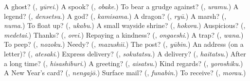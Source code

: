 \begin{tcolorbox}[breakable,colback=teal!4,colframe=teal!35!black,title={Before you move on}]
A ghost? (\textbf{}, \emph{yūrei}.) A spook? (\textbf{}, \emph{obake}.) To bear a grudge against? (\textbf{}, \emph{uramu}.) A legend? (\textbf{}, \emph{densetsu}.) A god? (\textbf{}, \emph{kamisama}.) A dragon? (\textbf{}, \emph{ryū}.) A marsh? (\textbf{}, \emph{numa}.) To float up? (\textbf{}, \emph{ukabu}.) A small wayside shrine? (\textbf{}, \emph{hokora}.) Auspicious? (\textbf{}, \emph{medetai}.) Thanks? (\textbf{}, \emph{orei}.) Repaying a kindness? (\textbf{}, \emph{ongaeshi}.) A trap? (\textbf{}, \emph{wana}.) To peep? (\textbf{}, \emph{nozoku}.) Needy? (\textbf{}, \emph{mazushii}.) The post? (\textbf{}, \emph{yūbin}.) An address (on a letter)? (\textbf{}, \emph{atesaki}.) Express delivery? (\textbf{}, \emph{sokutatsu}.) A delivery? (\textbf{}, \emph{haitatsu}.) After a long time? (\textbf{}, \emph{hisashiburi}.) A greeting? (\textbf{}, \emph{aisatsu}.) Kind regards? (\textbf{}, \emph{yoroshiku}.) A New Year's card? (\textbf{}, \emph{nengajō}.) Surface mail? (\textbf{}, \emph{funabin}.) To receive? (\textbf{}, \emph{morau}.)
\end{tcolorbox}
